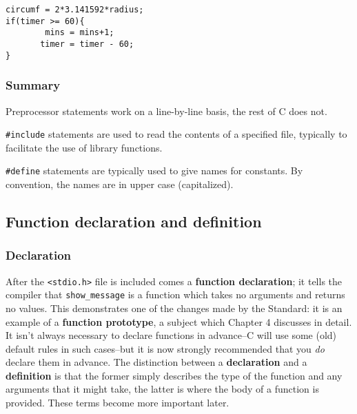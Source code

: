     \begin{Verbatim}
circumf = 2*3.141592*radius;
if(timer >= 60){
        mins = mins+1;
       timer = timer - 60;
}
\end{Verbatim}

   

   \subsubsection{Summary}
    Preprocessor statements work on a line-by-line basis, the rest of C does
     not.

    \texttt{\#include} statements are used to read the contents of a
     specified file, typically to facilitate the use of library functions.

    \texttt{\#define} statements are typically used to give names for
     constants. By convention, the names are in upper case (capitalized).

   
  

  \subsection{Function declaration and definition}
   

   \subsubsection{Declaration}
    

    After the \texttt{<stdio.h>} file is included comes a
     \textbf{function declaration}; it tells the compiler that
     \texttt{show\_message} is a function which takes no arguments and
     returns no values. This demonstrates one of the changes made by the
     Standard: it is an example of a \textbf{function prototype}, a subject
     which Chapter 4 discusses in detail. It isn't always
     necessary to declare functions in advance--C will use some (old)
     default rules in such cases--but it is now strongly recommended that
     you \textit{do} declare them in advance. The distinction between a
     \textbf{declaration} and a \textbf{definition} is that the former
     simply describes the type of the function and any arguments that it might
     take, the latter is where the body of a function is provided. These terms
     become more important later.



